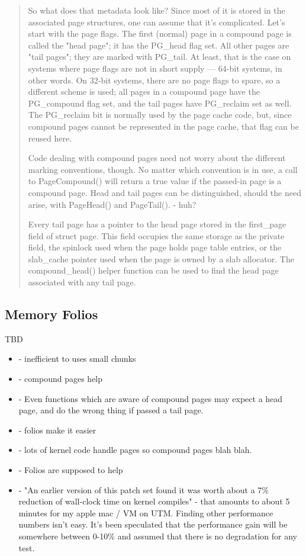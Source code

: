 \begin{quote}
So what does that metadata look like? Since most of it is stored in the associated page structures, one can assume that it's complicated. Let's start with the page flags. The first (normal) page in a compound page is called the "head page"; it has the PG\_head flag set. All other pages are "tail pages"; they are marked with PG\_tail. At least, that is the case on systems where page flags are not in short supply — 64-bit systems, in other words. On 32-bit systems, there are no page flags to spare, so a different scheme is used; all pages in a compound page have the PG\_compound flag set, and the tail pages have PG\_reclaim set as well. The PG\_reclaim bit is normally used by the page cache code, but, since compound pages cannot be represented in the page cache, that flag can be reused here.

Code dealing with compound pages need not worry about the different marking conventions, though. No matter which convention is in use, a call to PageCompound() will return a true value if the passed-in page is a compound page. Head and tail pages can be distinguished, should the need arise, with PageHead() and PageTail(). - huh?

Every tail page has a pointer to the head page stored in the first\_page field of struct page. This field occupies the same storage as the private field, the spinlock used when the page holds page table entries, or the slab\_cache pointer used when the page is owned by a slab allocator. The compound\_head() helper function can be used to find the head page associated with any tail page.
\end{quote}
	
\subsection{Memory Folios}\label{memory-folios}

TBD 

\begin{itemize}
	\item - inefficient to uses small  chunks
	\item - compound pages help
	\item - Even functions which are aware of compound pages may expect a head page, and do the wrong thing if passed a tail page.
	\item - folios make it easier
	\item - lots of kernel code handle pages so compound pages blah blah. 
	\item - Folios are supposed to help
	\item - "An earlier version of this patch set found it was worth about a 7\% reduction of wall-clock time on kernel compiles" - that amounts to about 5 minutes for my apple mac / VM on UTM. Finding other performance numbers isn't easy. It's been speculated that the performance gain will be somewhere between 0-10\% and assumed that there is no degradation for any test.
\end{itemize}

